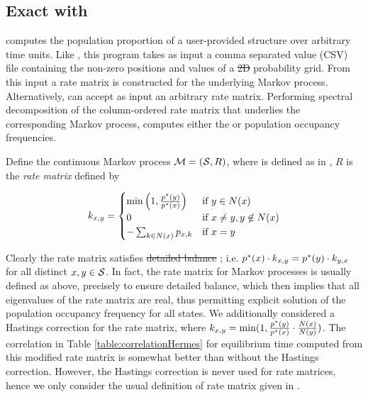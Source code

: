 \documentclass[11pt, oneside]{Thesis} %
\providecommand{\DIFadd}[1]{{\protect\color{blue}\uwave{#1}}} %
\providecommand{\DIFdel}[1]{{\protect\color{red}\sout{#1}}}                      %
\providecommand{\DIFaddbegin}{} %
\providecommand{\DIFaddend}{} %
\providecommand{\DIFdelbegin}{} %
\providecommand{\DIFdelend}{} %
\begin{document}
\subsection{Exact \eqt with \rnaeq}
\label{subsec:hermes:rnaeq}

\rnaeq computes the population proportion of a user-provided structure
over arbitrary time units. Like \rnamfpt, this program takes as input a
comma separated value (CSV) file containing the non-zero positions and
values of a \DIFdelbegin \DIFdel{2D }\DIFdelend \DIFaddbegin \twoD \DIFaddend probability grid. From this input a rate matrix
is constructed for the underlying Markov process. Alternatively,
\rnaeq can accept as input an arbitrary rate matrix. Performing
spectral decomposition of the column-ordered rate matrix that
underlies the corresponding Markov process, \rnaeq computes either
the \eqt or population occupancy frequencies.

Define the continuous Markov process
$\mathcal{M}=(\mathcal S,R)$, where \str is defined as in
, $R$ is the {\em rate matrix} defined by

\begin{align}
\label{eq:hermes:xitionRateWithoutHastings}
k_{x,y}=
\begin{cases}
\min\left(1, \frac{\pSt(y)}{\pSt(x)}\right)
& \text{if $y \in N(x)$} \\
0 &\text{if $x \ne y, y \not\in N(x)$} \\
- \sum_{k \in N(x)} p_{x,k} & \text{if $x=y$} \\
\end{cases}
\end{align}

Clearly the rate matrix satisfies \DIFdelbegin %
\DIFdel{detailed balance}%
\DIFdelend \DIFaddbegin \DIFadd{detailed balance}\DIFaddend ; i.e. $p^*(x)
\cdot k_{x,y} = p^*(y) \cdot k_{y,x}$ for all distinct $x,y \in
\mathcal S$. In fact, the rate matrix for Markov processes is usually
defined as above, precisely to ensure detailed balance, which then
implies that all eigenvalues of the rate matrix are real, thus
permitting explicit solution of the population occupancy frequency for
all states. We additionally considered a Hastings correction
for the rate matrix, where $k_{x,y} = \min(1, \frac{p^*(y)}{p^*(x)}
\cdot \frac{N(x)}{N(y)})$. The correlation in
Table \ref{table:correlationHermes} for equilibrium time computed from this
modified rate matrix is somewhat better than without the Hastings
correction. However, the Hastings correction is never used for rate
matrices, hence we only consider the usual definition of rate matrix
given in .
\end{document}

